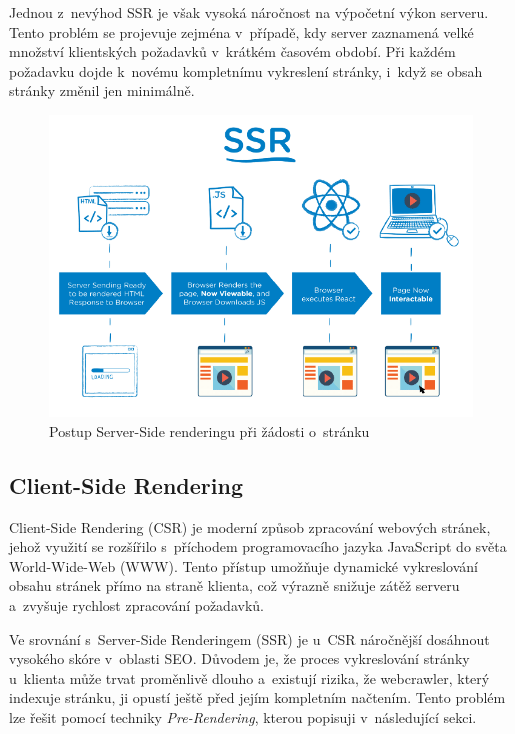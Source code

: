 Jednou z~nevýhod SSR je však vysoká náročnost na výpočetní výkon serveru. Tento problém se projevuje zejména v~případě, kdy server zaznamená velké množství klientských požadavků v~krátkém časovém období. Při každém požadavku dojde k~novému kompletnímu vykreslení stránky, i~když se obsah stránky změnil jen minimálně.

\begin{figure}[H]
    \centering
    \includegraphics[width=1.0\textwidth]{figures/server-side-rendering}
    \caption{Postup Server-Side renderingu při žádosti o~stránku \cite{rendering-diff}}
    \label{fig:server-side-rendering}
\end{figure}

\subsection{Client-Side Rendering}
\label{subsec:dev-request-processing-client-side-rendering}
Client-Side Rendering (CSR) je moderní způsob zpracování webových stránek, jehož využití se rozšířilo s~příchodem programovacího jazyka JavaScript do světa World-Wide-Web (WWW). Tento přístup umožňuje dynamické vykreslování obsahu stránek přímo na straně klienta, což výrazně snižuje zátěž serveru a~zvyšuje rychlost zpracování požadavků.

Ve srovnání s~Server-Side Renderingem (SSR) je u~CSR náročnější dosáhnout vysokého skóre v~oblasti SEO. Důvodem je, že proces vykreslování stránky u~klienta může trvat proměnlivě dlouho a~existují rizika, že webcrawler, který indexuje stránku, ji opustí ještě před jejím kompletním načtením. Tento problém lze řešit pomocí techniky \textit{Pre-Rendering}, kterou popisuji v~následující sekci.

